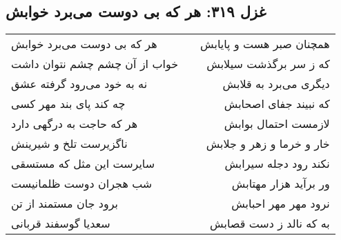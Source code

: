 \begin{center}
\section*{غزل ۳۱۹: هر که بی دوست می‌برد خوابش}
\label{sec:319}
\begin{longtable}{l p{0.5cm} r}
هر که بی دوست می‌برد خوابش
&&
همچنان صبر هست و پایابش
\\
خواب از آن چشم چشم نتوان داشت
&&
که ز سر برگذشت سیلابش
\\
نه به خود می‌رود گرفته عشق
&&
دیگری می‌برد به قلابش
\\
چه کند پای بند مهر کسی
&&
که نبیند جفای اصحابش
\\
هر که حاجت به درگهی دارد
&&
لازمست احتمال بوابش
\\
ناگزیرست تلخ و شیرینش
&&
خار و خرما و زهر و جلابش
\\
سایرست این مثل که مستسقی
&&
نکند رود دجله سیرابش
\\
شب هجران دوست ظلمانیست
&&
ور برآید هزار مهتابش
\\
برود جان مستمند از تن
&&
نرود مهر مهر احبابش
\\
سعدیا گوسفند قربانی
&&
به که نالد ز دست قصابش
\\
\end{longtable}
\end{center}
